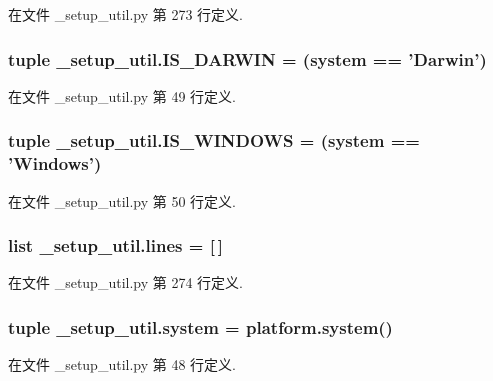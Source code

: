 在文件 \-\_\-setup\-\_\-util.\-py 第 273 行定义.

\hypertarget{namespace__setup__util_aecbb100ce6f94bb3c7e16d58fde05f96}{
\subsubsection[{I\-S\-\_\-\-D\-A\-R\-W\-I\-N}]{\setlength{\rightskip}{0pt plus 5cm}tuple \-\_\-setup\-\_\-util.\-I\-S\-\_\-\-D\-A\-R\-W\-I\-N = ({\bf system} == 'Darwin')}}\label{namespace__setup__util_aecbb100ce6f94bb3c7e16d58fde05f96}


在文件 \-\_\-setup\-\_\-util.\-py 第 49 行定义.

\hypertarget{namespace__setup__util_a6fe69c2dbd92959b6651a28cbb846e6e}{
\subsubsection[{I\-S\-\_\-\-W\-I\-N\-D\-O\-W\-S}]{\setlength{\rightskip}{0pt plus 5cm}tuple \-\_\-setup\-\_\-util.\-I\-S\-\_\-\-W\-I\-N\-D\-O\-W\-S = ({\bf system} == 'Windows')}}\label{namespace__setup__util_a6fe69c2dbd92959b6651a28cbb846e6e}


在文件 \-\_\-setup\-\_\-util.\-py 第 50 行定义.

\hypertarget{namespace__setup__util_a8618d8be5f729d4c9696daa5e083a001}{
\subsubsection[{lines}]{\setlength{\rightskip}{0pt plus 5cm}list \-\_\-setup\-\_\-util.\-lines = \mbox{[}$\,$\mbox{]}}}\label{namespace__setup__util_a8618d8be5f729d4c9696daa5e083a001}


在文件 \-\_\-setup\-\_\-util.\-py 第 274 行定义.

\hypertarget{namespace__setup__util_a5883fa688e2e824754a412ffc772863e}{
\subsubsection[{system}]{\setlength{\rightskip}{0pt plus 5cm}tuple \-\_\-setup\-\_\-util.\-system = platform.\-system()}}\label{namespace__setup__util_a5883fa688e2e824754a412ffc772863e}


在文件 \-\_\-setup\-\_\-util.\-py 第 48 行定义.

